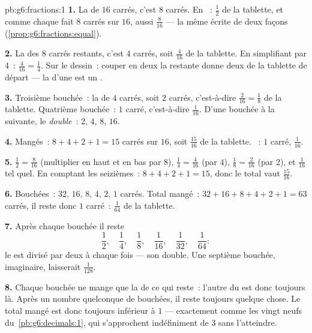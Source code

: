 \begin{solution}{pb:g6:fractions:1}
\textbf{1.} La  de $16$ carrés, c'est $8$ carrés. En
~: $\frac12$ de la tablette, et comme chaque  fait $8$
carrés sur $16$, aussi $\frac{8}{16}$ --- la même  écrite de
deux façons (\cref{prop:g6:fractions:equal}).

\textbf{2.} La  des $8$ carrés restants, c'est $4$ carrés,
soit $\frac{4}{16}$ de la tablette. En simplifiant par $4$~:
$\frac{4}{16} = \frac14$. Sur le dessin~: couper en deux la 
restante donne deux  de la tablette de départ --- la 
d'une  est un .

\textbf{3.} Troisième bouchée~: la  de $4$ carrés, soit $2$
carrés, c'est-à-dire $\frac{2}{16} = \frac18$ de la tablette.
Quatrième bouchée~: $1$ carré, c'est-à-dire $\frac{1}{16}$. D'une
bouchée à la suivante, le  \emph{double}~: $2$, $4$, $8$,
$16$.

\textbf{4.} Mangés~: $8 + 4 + 2 + 1 = 15$ carrés sur $16$, soit
$\frac{15}{16}$ de la tablette. ~: $1$ carré, $\frac{1}{16}$.

\textbf{5.} $\frac12 = \frac{8}{16}$ (multiplier en haut et en bas
par $8$), $\frac14 = \frac{4}{16}$ (par $4$),
$\frac18 = \frac{2}{16}$ (par $2$), et $\frac{1}{16}$  tel quel.
En comptant les seizièmes~: $8 + 4 + 2 + 1 = 15$, donc le total vaut
$\frac{15}{16}$.

\textbf{6.} Bouchées~: $32$, $16$, $8$, $4$, $2$, $1$ carrés. Total
mangé~: $32 + 16 + 8 + 4 + 2 + 1 = 63$ carrés, il reste donc $1$
carré~: $\frac{1}{64}$ de la tablette.

\textbf{7.} Après chaque bouchée il reste
\[
\frac12,\quad \frac14,\quad \frac18,\quad \frac{1}{16},\quad
\frac{1}{32},\quad \frac{1}{64} :
\]
le  est divisé par deux à chaque fois --- son 
double. Une septième bouchée, imaginaire, laisserait $\frac{1}{128}$.

\textbf{8.} Chaque bouchée ne mange que la \emph{} de ce qui
reste~: l'autre  du  est donc toujours là. Après un
nombre quelconque de bouchées, il reste toujours quelque chose. Le
total mangé est donc toujours inférieur à $1$ --- exactement comme
les vingt neufs du~\cref{pb:g6:decimals:1}, qui s'approchent
indéfiniment de $3$ sans l'atteindre.


\end{solution}
